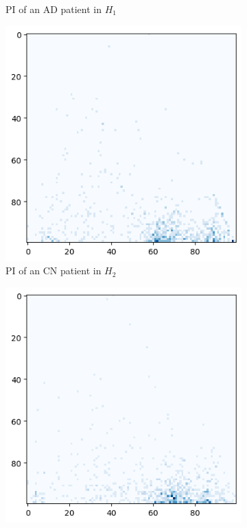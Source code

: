 \documentclass{article}
\begin{document}
\begin{figure}
\begin{subfigure}{0.32\textwidth}
    \caption{PI of an AD patient in $H_1$}
  \end{subfigure}
  \begin{subfigure}{0.32\textwidth}
    \includegraphics[width=\textwidth]{figures/PIs/Persistence_image_CN_h_2.png}
    \caption{PI of an CN patient in $H_2$}
  \end{subfigure}
  \begin{subfigure}{0.32\textwidth}
    \includegraphics[width=\textwidth]{figures/PIs/Persistence_image_MCI_h_2.png}

\end{subfigure}
\end{figure}
\end{document}

